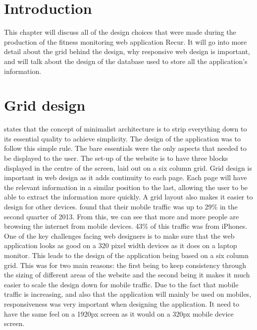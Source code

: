 \section{Introduction}
This chapter will discuss all of the design choices that were made during the production of the fitness monitoring web application Recur. It will go into more detail about the grid behind the design, why responsive web design is important, and will talk about the design of the database used to store all the application's information. \\

\section{Grid design}
\citet{bertoni:2002} states that the concept of minimalist architecture is to strip everything down to its essential quality to achieve simplicity. The design of the application was to follow this simple rule. The bare essentials were the only aspects that needed to be displayed to the user. The set-up of the website is to have three blocks displayed in the centre of the screen, laid out on a six column grid. Grid design is important in web design as it adds continuity to each page. Each page will have the relevant information in a similar position to the last, allowing the user to be able to extract the information more quickly. A grid layout also makes it easier to design for other devices. \citet{walkers:2013} found that their mobile traffic was up to 29\% in the second quarter of 2013. From this, we can see that more and more people are browsing the internet from mobile devices. 43\% of this traffic was from iPhones. One of the key challenges facing web designers is to make sure that the web application looks as good on a 320 pixel width devices as it does on a laptop monitor. This leads to the design of the application being based on a six column grid. This was for two main reasons: the first being to keep consistency through the sizing of different areas of the website and the second being it makes it much easier to scale the design down for mobile traffic. Due to the fact that mobile traffic is increasing, and also that the application will mainly be used on mobiles, responsiveness was very important when designing the application. It need to have the same feel on a 1920px screen as it would on a 320px mobile device screen.\\

